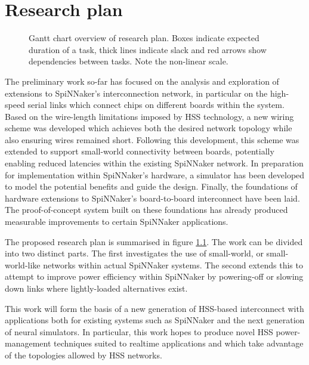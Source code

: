 \chapter{Research plan}
	\label{sec:research-plan}
	
	\begin{figure}[b!]
		\center
		
		\caption[Gantt chart overview of research plan.]{Gantt chart overview of
		research plan. Boxes indicate expected duration of a task, thick lines
		indicate slack and red arrows show dependencies between tasks. Note the
		non-linear scale.}
		\label{fig:plan-gantt}
	\end{figure}
	
	The preliminary work so-far has focused on the analysis and exploration of
	extensions to SpiNNaker's interconnection network, in particular on the
	high-speed serial links which connect chips on different boards within the
	system. Based on the wire-length limitations imposed by HSS technology, a new
	wiring scheme was developed which achieves both the desired network topology
	while also ensuring wires remained short. Following this development, this
	scheme was extended to support small-world connectivity between boards,
	potentially enabling reduced latencies within the existing SpiNNaker network.
	In preparation for implementation within SpiNNaker's hardware, a simulator has
	been developed to model the potential benefits and guide the design. Finally,
	the foundations of hardware extensions to SpiNNaker's board-to-board
	interconnect have been laid. The proof-of-concept system built on these
	foundations has already produced measurable improvements to certain SpiNNaker
	applications.
	
	The proposed research plan is summarised in figure \ref{fig:plan-gantt}. The
	work can be divided into two distinct parts. The first investigates the use of
	small-world, or small-world-like networks within actual SpiNNaker systems. The
	second extends this to attempt to improve power efficiency within SpiNNaker by
	powering-off or slowing down links where lightly-loaded alternatives exist.
	
	This work will form the basis of a new generation of HSS-based interconnect
	with applications both for existing systems such as SpiNNaker and the next
	generation of neural simulators. In particular, this work hopes to produce
	novel HSS power-management techniques suited to realtime applications and
	which take advantage of the topologies allowed by HSS networks.
	
